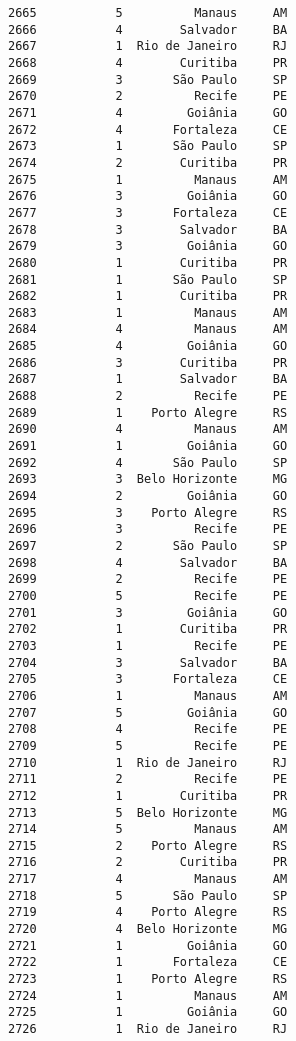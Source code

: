\documentclass[11pt]{article}
\begin{document}
\begin{Verbatim}[commandchars=\\\{\}]
2665           5          Manaus     AM  
2666           4        Salvador     BA  
2667           1  Rio de Janeiro     RJ  
2668           4        Curitiba     PR  
2669           3       São Paulo     SP  
2670           2          Recife     PE  
2671           4         Goiânia     GO  
2672           4       Fortaleza     CE  
2673           1       São Paulo     SP  
2674           2        Curitiba     PR  
2675           1          Manaus     AM  
2676           3         Goiânia     GO  
2677           3       Fortaleza     CE  
2678           3        Salvador     BA  
2679           3         Goiânia     GO  
2680           1        Curitiba     PR  
2681           1       São Paulo     SP  
2682           1        Curitiba     PR  
2683           1          Manaus     AM  
2684           4          Manaus     AM  
2685           4         Goiânia     GO  
2686           3        Curitiba     PR  
2687           1        Salvador     BA  
2688           2          Recife     PE  
2689           1    Porto Alegre     RS  
2690           4          Manaus     AM  
2691           1         Goiânia     GO  
2692           4       São Paulo     SP  
2693           3  Belo Horizonte     MG  
2694           2         Goiânia     GO  
2695           3    Porto Alegre     RS  
2696           3          Recife     PE  
2697           2       São Paulo     SP  
2698           4        Salvador     BA  
2699           2          Recife     PE  
2700           5          Recife     PE  
2701           3         Goiânia     GO  
2702           1        Curitiba     PR  
2703           1          Recife     PE  
2704           3        Salvador     BA  
2705           3       Fortaleza     CE  
2706           1          Manaus     AM  
2707           5         Goiânia     GO  
2708           4          Recife     PE  
2709           5          Recife     PE  
2710           1  Rio de Janeiro     RJ  
2711           2          Recife     PE  
2712           1        Curitiba     PR  
2713           5  Belo Horizonte     MG  
2714           5          Manaus     AM  
2715           2    Porto Alegre     RS  
2716           2        Curitiba     PR  
2717           4          Manaus     AM  
2718           5       São Paulo     SP  
2719           4    Porto Alegre     RS  
2720           4  Belo Horizonte     MG  
2721           1         Goiânia     GO  
2722           1       Fortaleza     CE  
2723           1    Porto Alegre     RS  
2724           1          Manaus     AM  
2725           1         Goiânia     GO  
2726           1  Rio de Janeiro     RJ  

\end{Verbatim}
\end{document}

